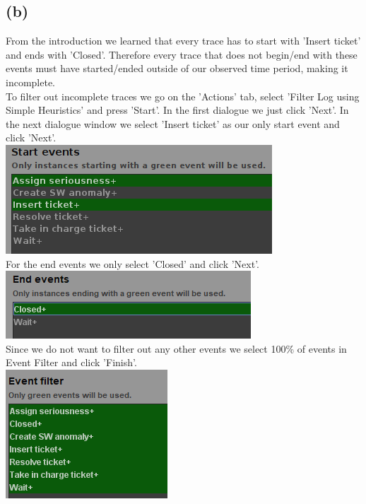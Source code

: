 \documentclass[../../main.tex]{subfiles}
\begin{document}
\subsection*{(b)}
From the introduction we learned that every trace has to start with 'Insert ticket' and ends with 'Closed'. Therefore every trace that does not begin/end with these events must have started/ended outside of our observed time period, making it incomplete.\\
To filter out incomplete traces we go on the 'Actions' tab, select 'Filter Log using Simple Heuristics' and press 'Start'. In the first dialogue we just click 'Next'. In the next dialogue window we select 'Insert ticket' as our only start event and click 'Next'. \\
\includegraphics[width=0.5\columnwidth]{img/ProM_b_filter_traces_start.png}\\
For the end events we only select 'Closed' and click 'Next'. \\
\includegraphics[width=0.5\columnwidth]{img/ProM_b_filter_traces_end.png}\\
Since we do not want to filter out any other events we select 100\% of events in Event Filter and click 'Finish'.\\
\includegraphics[width=0.5\columnwidth]{img/ProM_b_filter_traces_events.png}\\
\end{document}
